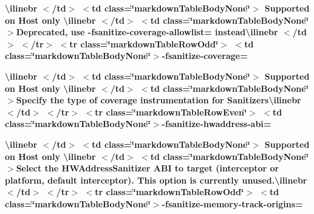 \begin{longtabu}
{\bfseries{{\ttfamily \textbackslash{}ilinebr \texorpdfstring{$<$}{<}/td\texorpdfstring{$>$}{>} \texorpdfstring{$<$}{<}td class=\char`\"{}markdown\+Table\+Body\+None\char`\"{}\texorpdfstring{$>$}{>} Supported on Host only \textbackslash{}ilinebr \texorpdfstring{$<$}{<}/td\texorpdfstring{$>$}{>} \texorpdfstring{$<$}{<}td class=\char`\"{}markdown\+Table\+Body\+None\char`\"{}\texorpdfstring{$>$}{>}}Deprecated, use -\/fsanitize-\/coverage-\/allowlist= instead{\ttfamily \textbackslash{}ilinebr \texorpdfstring{$<$}{<}/td\texorpdfstring{$>$}{>} \texorpdfstring{$<$}{<}/tr\texorpdfstring{$>$}{>} \texorpdfstring{$<$}{<}tr class=\char`\"{}markdown\+Table\+Row\+Odd\char`\"{}\texorpdfstring{$>$}{>} \texorpdfstring{$<$}{<}td class=\char`\"{}markdown\+Table\+Body\+None\char`\"{}\texorpdfstring{$>$}{>}}-\/fsanitize-\/coverage=}}

{\bfseries{{\ttfamily \textbackslash{}ilinebr \texorpdfstring{$<$}{<}/td\texorpdfstring{$>$}{>} \texorpdfstring{$<$}{<}td class=\char`\"{}markdown\+Table\+Body\+None\char`\"{}\texorpdfstring{$>$}{>} Supported on Host only \textbackslash{}ilinebr \texorpdfstring{$<$}{<}/td\texorpdfstring{$>$}{>} \texorpdfstring{$<$}{<}td class=\char`\"{}markdown\+Table\+Body\+None\char`\"{}\texorpdfstring{$>$}{>}}Specify the type of coverage instrumentation for Sanitizers{\ttfamily \textbackslash{}ilinebr \texorpdfstring{$<$}{<}/td\texorpdfstring{$>$}{>} \texorpdfstring{$<$}{<}/tr\texorpdfstring{$>$}{>} \texorpdfstring{$<$}{<}tr class=\char`\"{}markdown\+Table\+Row\+Even\char`\"{}\texorpdfstring{$>$}{>} \texorpdfstring{$<$}{<}td class=\char`\"{}markdown\+Table\+Body\+None\char`\"{}\texorpdfstring{$>$}{>}}-\/fsanitize-\/hwaddress-\/abi=}}

{\bfseries{{\ttfamily \textbackslash{}ilinebr \texorpdfstring{$<$}{<}/td\texorpdfstring{$>$}{>} \texorpdfstring{$<$}{<}td class=\char`\"{}markdown\+Table\+Body\+None\char`\"{}\texorpdfstring{$>$}{>} Supported on Host only \textbackslash{}ilinebr \texorpdfstring{$<$}{<}/td\texorpdfstring{$>$}{>} \texorpdfstring{$<$}{<}td class=\char`\"{}markdown\+Table\+Body\+None\char`\"{}\texorpdfstring{$>$}{>}}Select the HWAddress\+Sanitizer ABI to target (interceptor or platform, default interceptor). This option is currently unused.{\ttfamily \textbackslash{}ilinebr \texorpdfstring{$<$}{<}/td\texorpdfstring{$>$}{>} \texorpdfstring{$<$}{<}/tr\texorpdfstring{$>$}{>} \texorpdfstring{$<$}{<}tr class=\char`\"{}markdown\+Table\+Row\+Odd\char`\"{}\texorpdfstring{$>$}{>} \texorpdfstring{$<$}{<}td class=\char`\"{}markdown\+Table\+Body\+None\char`\"{}\texorpdfstring{$>$}{>}}-\/fsanitize-\/memory-\/track-\/origins=}}


\end{longtabu}
